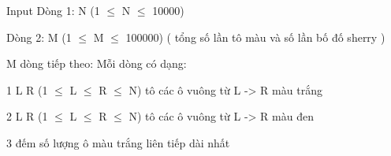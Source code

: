 Input
Dòng 1: N (1  $\le$  N  $\le$  10000)  

   Dòng 2: M (1  $\le$  M  $\le$  100000) ( tổng số lần tô màu và số lần bố đố sherry )  

   M dòng tiếp theo: Mỗi dòng có dạng:  

   1  L  R  (1  $\le$  L  $\le$  R  $\le$  N) tô các ô vuông từ L -> R màu trắng  

   2  L  R  (1  $\le$  L  $\le$  R  $\le$  N) tô các ô vuông từ L -> R màu đen  

   3 đếm số lượng ô màu trắng liên tiếp dài nhất